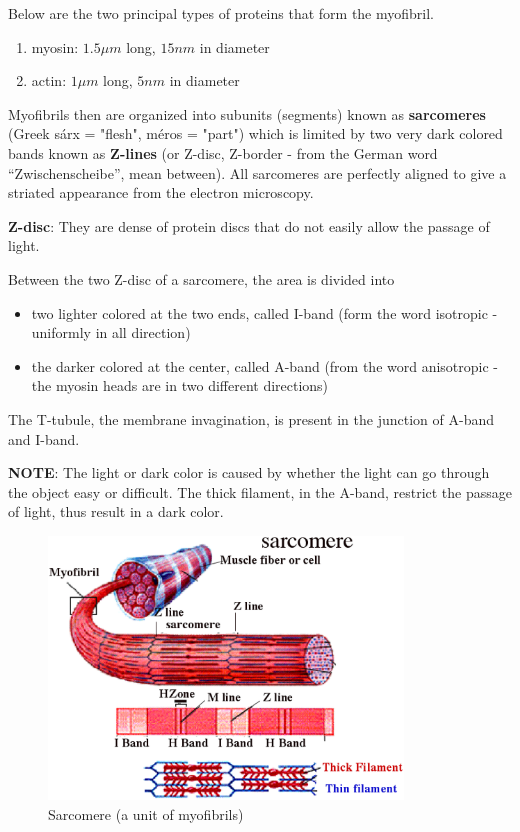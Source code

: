 Below are the two principal types of proteins that form the myofibril.
\begin{enumerate}
\item myosin: $1.5\mu m$ long, $15nm$ in diameter
\item actin: $1\mu m$ long, $5nm$ in diameter
\end{enumerate}

Myofibrils then are organized into subunits (segments) known as
{\bf sarcomeres} (Greek sárx = "flesh", méros = "part") which is
limited by two very dark colored bands known as {\bf Z-lines} (or
Z-disc, Z-border - from the German word ``Zwischenscheibe'', mean
between). All sarcomeres are perfectly aligned to give a striated
appearance from the electron microscopy. 

{\bf Z-disc}: They are dense of protein discs that do not easily allow
the passage of light. 

Between the two Z-disc of a sarcomere, the area is divided into 
\begin{itemize}
\item two lighter colored at the two ends, called I-band (form the
  word isotropic - uniformly in all direction)
\item the darker colored at the center, called A-band (from the word
  anisotropic - the myosin heads are in two different directions)
\end{itemize}
The T-tubule, the membrane invagination, is present in the junction of
A-band and I-band.


{\bf NOTE}: The light or dark color is caused by whether the light can
go through the object easy or difficult. The thick filament, in the
A-band, restrict the passage of light, thus result in a dark color.


\begin{figure}[htb]
  \centerline{\includegraphics[height=7cm]{./images/sarcomere_0.eps}}
  \caption{Sarcomere (a unit of myofibrils)}\label{fig:sarcomere}
\end{figure}


